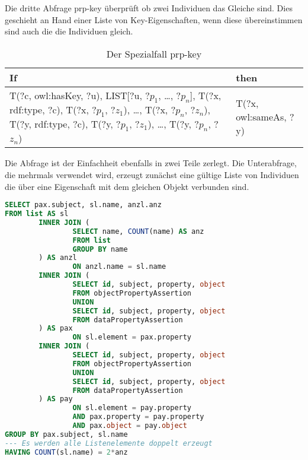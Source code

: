 Die dritte Abfrage prp-key überprüft ob zwei Individuen das Gleiche sind. Dies geschieht an Hand einer Liste  von Key-Eigenschaften, wenn diese übereinstimmen sind auch die die Individuen gleich.
\begin{table}[htb]
\begin{center}
	\begin{tabular}{m{4.5cm}|m{4cm}}
	If & then \\ \hline
	T(?c, owl:hasKey, ?u),\newline
	LIST[?u, ?$p_1$, \ldots, ?$p_n$],\newline
	T(?x, rdf:type, ?c),\newline
	T(?x, ?$p_1$, ?$z_1$),\newline
	\ldots,\newline
	T(?x, ?$p_n$, ?$z_n$),\newline
	T(?y, rdf:type, ?c),\newline
	T(?y, ?$p_1$, ?$z_1$),\newline
	\ldots,\newline
	T(?y, ?$p_n$, ?$z_n$) & T(?x, owl:sameAs, ?y)
	\end{tabular}
\end{center}
	\caption{Der Spezialfall prp-key}
	\label{rule-prp-key}
\end{table}


Die Abfrage ist der Einfachheit ebenfalls in zwei Teile zerlegt. Die Unterabfrage, die mehrmals verwendet wird, erzeugt zunächst eine gültige Liste von Individuen die über eine Eigenschaft mit dem gleichen Objekt verbunden sind.
\begin{lstlisting}[language=SQL]
SELECT pax.subject, sl.name, anzl.anz
FROM list AS sl
        INNER JOIN (
                SELECT name, COUNT(name) AS anz
                FROM list
                GROUP BY name
        ) AS anzl
                ON anzl.name = sl.name
        INNER JOIN (
                SELECT id, subject, property, object
                FROM objectPropertyAssertion
                UNION
                SELECT id, subject, property, object
                FROM dataPropertyAssertion
        ) AS pax
                ON sl.element = pax.property
        INNER JOIN (
                SELECT id, subject, property, object
                FROM objectPropertyAssertion
                UNION
                SELECT id, subject, property, object
                FROM dataPropertyAssertion
        ) AS pay
                ON sl.element = pay.property
                AND pax.property = pay.property
                AND pax.object = pay.object
GROUP BY pax.subject, sl.name
--- Es werden alle Listenelemente doppelt erzeugt
HAVING COUNT(sl.name) = 2*anz
\end{lstlisting}

